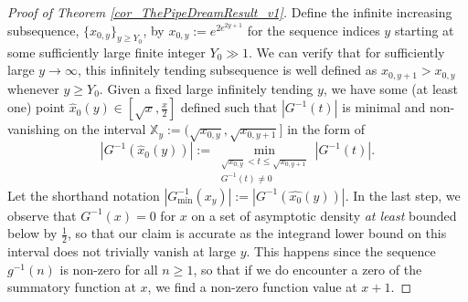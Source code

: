 \documentclass[11pt,reqno,a4letter]{article}
\numberwithin{figure}{section}
\numberwithin{table}{section}
\theoremstyle{plain}
\numberwithin{theorem}{section}
\theoremstyle{definition}
\begin{document}
\begin{proof}[Proof of Theorem \ref{cor_ThePipeDreamResult_v1}] 
\label{proofOf_cor_ThePipeDreamResult_v1} 
Define the infinite increasing subsequence, 
$\{x_{0,y}\}_{y \geq Y_0}$, by $x_{0,y} := e^{2e^{2y+1}}$ for the sequence indices $y$ 
starting at some sufficiently 
large finite integer $Y_0 \gg 1$. 
We can verify that for sufficiently large $y \rightarrow \infty$, this infinitely 
tending subsequence is well defined as $x_{0,y+1} > x_{0,y}$ whenever $y \geq Y_0$. 
Given a fixed large infinitely tending $y$, we have some (at least one) point 
$\widehat{x}_0(y) \in \left[\sqrt{x}, \frac{x}{2}\right]$ defined such that 
$|G^{-1}(t)|$ is minimal and non-vanishing on the interval 
$\mathbb{X}_y := (\sqrt{x_{0,y}}, \sqrt{x_{0,y+1}}]$ 
in the form of 
\[
\left\lvert G^{-1}(\widehat{x}_0(y)) \right\rvert := 
     \min_{\substack{\sqrt{x_{0,y}} < t \leq \sqrt{x_{0,y+1}} \\ G^{-1}(t) \neq 0}} |G^{-1}(t)|. 
\] 
Let the shorthand notation $|G_{\min}^{-1}(x_y)| := |G^{-1}(\widehat{x_0}(y))|$. 
In the last step, we observe that $G^{-1}(x) = 0$ for $x$ on a set of 
asymptotic density \emph{at least} bounded below by $\frac{1}{2}$, so that our 
claim is accurate as the integrand lower bound on this interval 
does not trivially vanish at large $y$. This happens since the sequence 
$g^{-1}(n)$ is non-zero for all $n \geq 1$, so that if we do encounter a zero of the 
summatory function at $x$, we find a non-zero function value at $x+1$. 


\end{proof}
\end{document}
